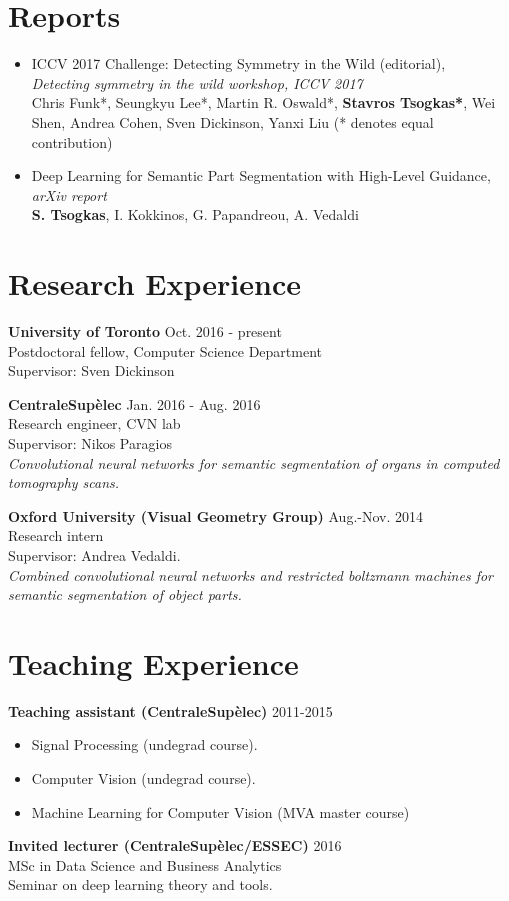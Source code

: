 \documentclass[margin]{res}
\begin{document}
\begin{resume}
\section{Reports}
	\begin{itemize}
		\item ICCV 2017 Challenge: Detecting Symmetry in the Wild (editorial), \\
		\emph{Detecting symmetry in the wild workshop, ICCV 2017}\\
		Chris Funk*, Seungkyu Lee*, Martin R. Oswald*, \textbf{Stavros Tsogkas*}, 
		Wei Shen, Andrea Cohen, Sven Dickinson, Yanxi Liu 
		(* denotes equal contribution)
		\item  Deep Learning for Semantic Part Segmentation with High-Level Guidance, \emph{arXiv report}\\
		\textbf{S. Tsogkas}, I. Kokkinos, G. Papandreou, A. Vedaldi 
  \end{itemize}

\section{Research Experience} 
\textbf{University of Toronto} \hfill Oct. 2016 - present\\
Postdoctoral fellow, Computer Science Department\\
Supervisor: Sven Dickinson

\textbf{CentraleSup\`elec} \hfill Jan. 2016 - Aug. 2016\\
Research engineer, CVN lab \\
Supervisor: Nikos Paragios \\
\emph{Convolutional neural networks for semantic 
	segmentation of organs in computed tomography scans.
}

\textbf{Oxford University (Visual Geometry Group)} \hfill Aug.-Nov. 2014\\
Research intern \\
Supervisor: Andrea Vedaldi. \\
\emph{Combined convolutional neural networks 
	and restricted boltzmann machines for semantic segmentation 
	of object parts.
}


\section{Teaching Experience} 
	\textbf{Teaching assistant (CentraleSup\`elec)}   \hfill 2011-2015 
	\begin{itemize}
		\item Signal Processing  (undegrad course).  
		\item Computer Vision  (undegrad course).
		\item Machine Learning for Computer Vision (MVA master course)
	\end{itemize}
	\textbf{Invited lecturer (CentraleSup\`elec/ESSEC)} \hfill 2016 \\
	MSc in Data Science and Business Analytics \\
	Seminar on deep learning theory and tools.



\end{resume}
\end{document}
